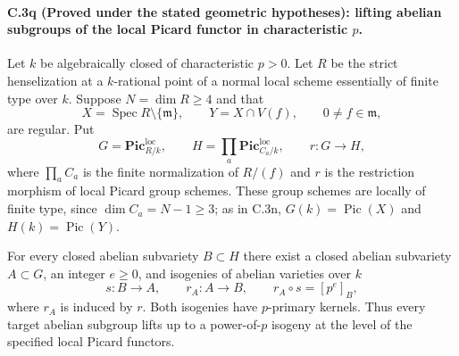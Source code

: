 \paragraph{C.3q (Proved under the stated geometric hypotheses): lifting abelian subgroups of the local Picard functor in characteristic $p$.}
Let $k$ be algebraically closed of characteristic
$p>0$. Let $R$ be the strict henselization at a
$k$-rational point of a normal local scheme
essentially of finite type over $k$. Suppose
$N=\dim R\ge4$ and that
\[
 X=\operatorname{Spec}R\setminus\{\mathfrak m\},
 \qquad Y=X\cap V(f),\qquad0\ne f\in\mathfrak m,
\]
are regular. Put
\[
 G=\mathbf{Pic}^{\mathrm{loc}}_{R/k},\qquad
 H=\prod_a\mathbf{Pic}^{\mathrm{loc}}_{C_a/k},
 \qquad r:G\longrightarrow H,
\]
where $\prod_a C_a$ is the finite normalization
of $R/(f)$ and $r$ is the restriction morphism
of local Picard group schemes. These group
schemes are locally of finite type, since
$\dim C_a=N-1\ge3$; as in C.3n,
$G(k)=\operatorname{Pic}(X)$ and
$H(k)=\operatorname{Pic}(Y)$.

For every closed abelian subvariety $B\subset H$
there exist a closed abelian subvariety $A\subset G$,
an integer $e\ge0$, and isogenies of abelian
varieties over $k$
\begin{equation}\label{eq:C3-abelian-local-lift}
 s:B\longrightarrow A,\qquad
 r_A:A\longrightarrow B,\qquad
 r_A\circ s=[p^e]_B,
\end{equation}
where $r_A$ is induced by $r$. Both isogenies
have $p$-primary kernels. Thus every target
abelian subgroup lifts up to a power-of-$p$
isogeny at the level of the specified local
Picard functors.

